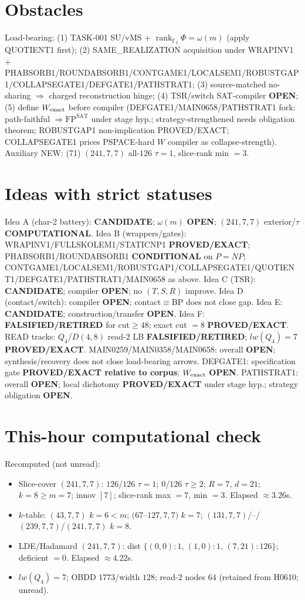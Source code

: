 \documentclass[11pt]{article}
\begin{document}
\section*{Obstacles}
Load-bearing: (1) TASK-001 SU/vMS + $\operatorname{rank}_{\mathbb F_2}\Phi=\omega(m)$ (apply QUOTIENT1 first);
(2) SAME\_REALIZATION acquisition under WRAPINV1 + PHABSORB1/ROUNDABSORB1/CONTGAME1/LOCALSEM1/ROBUSTGAP1/COLLAPSEGATE1/DEFGATE1/PATHSTRAT1;
(3) source-matched no-sharing $\Rightarrow$ charged reconstruction hinge;
(4) TSR/switch SAT-compiler \textbf{OPEN};
(5) define $W_{\rm exact}$ before compiler (DEFGATE1/MAIN0658/PATHSTRAT1 fork:
path-faithful $\Rightarrow\mathrm{FP}^{\mathrm{SAT}}$ under stage hyp.; strategy-strengthened needs obligation theorem;
ROBUSTGAP1 non-implication PROVED/EXACT; COLLAPSEGATE1 prices PSPACE-hard $W$ compiler as collapse-strength).
Auxiliary NEW: (71) $(241,7,7)$ all-$126$ $\tau{=}1$, slice-rank min $=3$.

\section*{Ideas with strict statuses}
Idea A (char-2 battery): \textbf{CANDIDATE}; $\omega(m)$ \textbf{OPEN}; $(241,7,7)$ exterior/$\tau$ \textbf{COMPUTATIONAL}.
Idea B (wrappers/gates): WRAPINV1/FULLSKOLEM1/STATICNP1 \textbf{PROVED/EXACT};
PHABSORB1/ROUNDABSORB1 \textbf{CONDITIONAL} on $P=NP$;
CONTGAME1/LOCALSEM1/ROBUSTGAP1/COLLAPSEGATE1/QUOTIENT1/DEFGATE1/PATHSTRAT1/MAIN0658 as above.
Idea C (TSR): \textbf{CANDIDATE}; compiler \textbf{OPEN}; no $(T,S,R)$ improve.
Idea D (contact/switch): compiler \textbf{OPEN}; contact$\equiv$BP does not close gap.
Idea E: \textbf{CANDIDATE}; construction/transfer \textbf{OPEN}.
Idea F: \textbf{FALSIFIED/RETIRED} for cut$\ge48$; exact cut $=8$ \textbf{PROVED/EXACT}.
READ tracks: $Q_4$/$D(4,8)$ read-$2$ LB \textbf{FALSIFIED/RETIRED}; $lw(Q_4)=7$ \textbf{PROVED/EXACT}.
MAIN0259/MAIN0358/MAIN0658: overall \textbf{OPEN}; synthesis/recovery does not close load-bearing arrows.
DEFGATE1: specification gate \textbf{PROVED/EXACT relative to corpus}; $W_{\rm exact}$ \textbf{OPEN}.
PATHSTRAT1: overall \textbf{OPEN}; local dichotomy \textbf{PROVED/EXACT} under stage hyp.; strategy obligation \textbf{OPEN}.

\section*{This-hour computational check}
Recomputed (not unread):
\begin{itemize}
\item Slice-cover $(241,7,7)$: $126/126$ $\tau{=}1$; $0/126$ $\tau{\ge}2$; $R{=}7$, $d{=}21$;
  $k{=}8{\ge}m{=}7$; innov $[7]$; slice-rank max $=7$, min $=3$. Elapsed $\approx3.26$s.
\item $k$-table: $(43,7,7)$ $k{=}6{<}m$; $(67$--$127,7,7)$ $k{=}7$;
  $(131,7,7)$/--/$(239,7,7)$/$(241,7,7)$ $k{=}8$.
\item LDE/Hadamard $(241,7,7)$: dist $\{(0,0){:}1,\,(1,0){:}1,\,(7,21){:}126\}$; deficient $=0$. Elapsed $\approx4.22$s.
\item $lw(Q_4)=7$; OBDD $1773$/width $128$; read-$2$ nodes $64$ (retained from H0610; unread).
\end{itemize}
\end{document}
